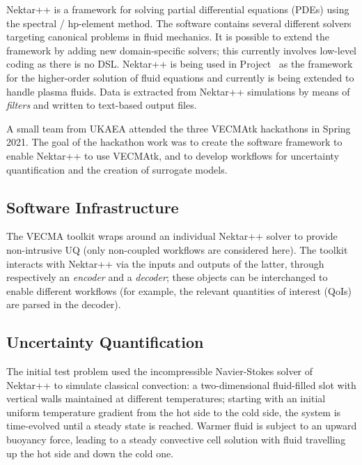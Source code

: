 

Nektar++ \cite{Mo20Nekt, nektarwebsite} is a framework for solving partial differential equations (PDEs) using the spectral / hp-element method.  
The software contains several different solvers targeting canonical problems in fluid mechanics.  
It is possible to extend the framework by adding new domain-specific solvers; this currently involves low-level coding as there is no DSL.  
Nektar++ is being used in Project \nep\ as the framework for the higher-order solution of fluid equations and currently is being extended to handle plasma fluids.  Data is extracted from Nektar++ simulations by means of \emph{filters} and written to text-based output files.

A small team from UKAEA 
attended the three VECMAtk hackathons in Spring 2021.
The goal of the hackathon work was to create the software framework to enable
Nektar++ to use VECMAtk,
and to develop workflows for uncertainty quantification and the creation of
surrogate models.

\subsection{Software Infrastructure}

The VECMA toolkit wraps around an individual Nektar++ solver to provide non-intrusive UQ (only non-coupled workflows are considered here).  
The toolkit interacts with Nektar++ via the inputs and outputs of the latter, through respectively an \emph{encoder} and a \emph{decoder}; 
these objects can be interchanged to enable different workflows (for example, the relevant quantities of interest (QoIs) are parsed in the decoder). 

\subsection{Uncertainty Quantification}

The initial test problem used the incompressible Navier-Stokes solver of Nektar++ to simulate classical convection: 
a two-dimensional fluid-filled slot with vertical walls maintained at different temperatures; starting with an initial uniform temperature gradient from the hot side to the cold side, the system is time-evolved until a steady state is reached.  
Warmer fluid is subject to an upward buoyancy force, leading to a steady convective cell solution with fluid travelling up the hot side and down the cold one.

